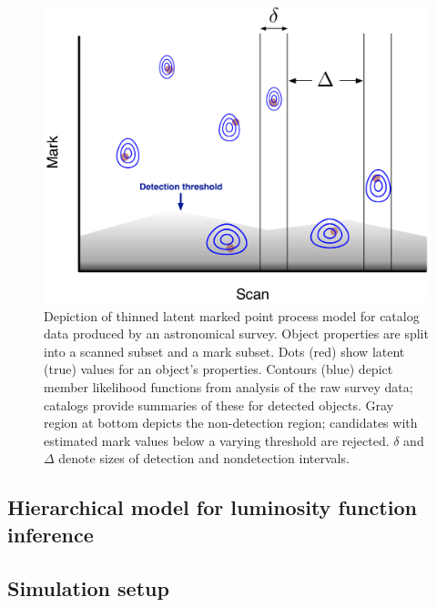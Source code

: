 \begin{figure}
\begin{center}
\includegraphics[width=.8\textwidth]{fig/ScanMarkPtProcess-Thin+Err}
\end{center}
\caption{Depiction of thinned latent marked point process model for catalog data produced by an astronomical survey.
Object properties are split into a scanned subset and a mark subset.
Dots (red) show latent (true) values for an object's properties.
Contours (blue) depict member likelihood functions from analysis of the raw survey data; catalogs provide summaries of these for detected objects.
Gray region at bottom depicts the non-detection region; candidates with estimated mark values below a varying threshold are rejected.
$\delta$ and $\Delta$ denote sizes of detection and nondetection intervals.}
\label{fig:ScanMark}
\end{figure}











\subsection{Hierarchical model for luminosity function inference}
\label{sec:hm}



\subsection{Simulation setup}
\label{sec:simsetup}

